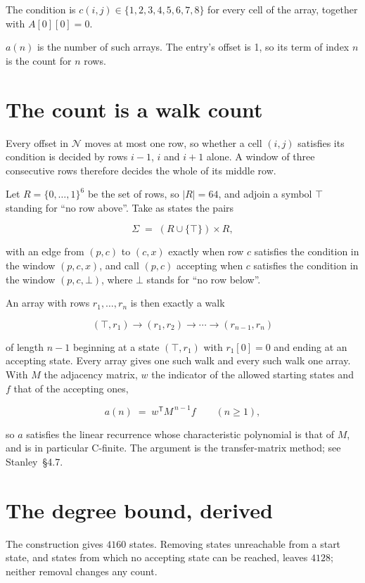 \documentclass[11pt]{article}
\theoremstyle{definition}
\begin{document}
The condition is $c(i,j) \in \{1, 2, 3, 4, 5, 6, 7, 8\}$ for every cell of the array, together with $A[0][0]=0$.

$a(n)$ is the number of such arrays. The entry's offset is 1, so its term of index $n$ is the count for $n$ rows.

\section{The count is a walk count}

Every offset in $\mathcal{N}$ moves at most one row, so whether a cell $(i,j)$ satisfies its condition is decided by rows $i-1$, $i$ and $i+1$ alone. A window of three consecutive rows therefore decides the whole of its middle row.

Let $R = \{0,\dots,1\}^{6}$ be the set of rows, so $|R| = 64$, and adjoin a symbol $\top$ standing for ``no row above''. Take as states the pairs

\[\Sigma \;=\; (R \cup \{\top\}) \times R,\]

with an edge from $(p,c)$ to $(c,x)$ exactly when row $c$ satisfies the condition in the window $(p,c,x)$, and call $(p,c)$ accepting when $c$ satisfies the condition in the window $(p,c,\bot)$, where $\bot$ stands for ``no row below''.

An array with rows $r_1,\dots,r_n$ is then exactly a walk

\[(\top,r_1) \to (r_1,r_2) \to \cdots \to (r_{n-1},r_n)\]

of length $n-1$ beginning at a state $(\top,r_1)$ with $r_1[0]=0$ and ending at an accepting state. Every array gives one such walk and every such walk one array. With $M$ the adjacency matrix, $w$ the indicator of the allowed starting states and $f$ that of the accepting ones,

\[a(n) \;=\; w^{\mathsf T} M^{\,n-1} f \qquad (n \ge 1),\]

so $a$ satisfies the linear recurrence whose characteristic polynomial is that of $M$, and is in particular C-finite. The argument is the transfer-matrix method; see Stanley~\S4.7.

\section{The degree bound, derived}

The construction gives $4160$ states. Removing states unreachable from a start state, and states from which no accepting state can be reached, leaves $4128$; neither removal changes any count.
\end{document}
